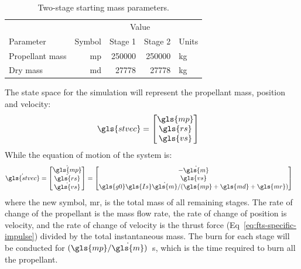 \documentclass[12pt,openany]{book}
\begin{document}
\begin{table}
  \centering
  \begin{tabular}[htbp]{ l r r r l }
    \toprule
                    &          & \multicolumn{2}{c}{Value}    &           \\ \cmidrule{3-4}
    Parameter       & Symbol   & Stage 1      & Stage 2       & Units     \\ \midrule
    Propellant mass & \gls{mp} & \num{250000} & \num{250000}  & \si{kg}   \\
    Dry mass        & \gls{md} & \num{27778}  & \num{27778}   & \si{kg}   \\
    \bottomrule
  \end{tabular}
  \caption{Two-stage starting mass parameters.}
  \label{tab:two-stage}
\end{table}

The state space for the simulation will represent the propellant mass, position and velocity:
\begin{align}
  \gls{stvec} &=
  \begin{bmatrix}
    \gls{mp} \\
    \gls{rs} \\
    \gls{vs}
  \end{bmatrix}
\end{align}
While the equation of motion of the system is:
\begin{align}
  \dot{\gls{stvec}} &=
  \begin{bmatrix}
    \dot{\gls{mp}} \\
    \dot{\gls{rs}} \\
    \dot{\gls{vs}}
  \end{bmatrix} =
  \begin{bmatrix}
    -\dot{\gls{m}} \\
    \gls{vs} \\
    \gls{g0}\gls{Is}\dot{\gls{m}} / (\gls{mp} + \gls{md} + \gls{mr})
  \end{bmatrix}
  \label{eq:stage-eom}
\end{align}
where the new symbol, \gls{mr}, is the total mass of all remaining stages. The rate of change of the propellant is the mass flow rate, the rate of change of position is velocity, and the rate of change of velocity is the thrust force (Eq~\ref{eq:fts-specific-impulse}) divided by the total instantaneous mass. The burn for each stage will be conducted for \((\gls{mp}/\dot{\gls{m}})\)~\si{s}, which is the time required to burn all the propellant.
\end{document}

